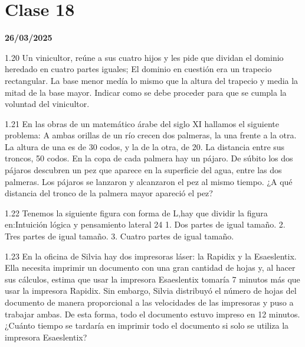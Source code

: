 \section{Clase 18}
\textbf{26/03/2025}

1.20 Un vinicultor, reúne a sus cuatro hijos y les pide que dividan el dominio heredado en cuatro partes iguales; El dominio en cuestión era un trapecio rectangular. La base menor medía lo mismo que la altura del trapecio y media la mitad de la base mayor. Indicar como se debe proceder para que se cumpla la voluntad del vinicultor.

1.21 En las obras de un matemático árabe del siglo XI hallamos el siguiente problema: A ambas orillas de un río crecen dos palmeras, la una frente a la otra. La altura de una es de 30 codos, y la de la otra, de 20. La distancia entre sus troncos, 50 codos. En la copa de cada palmera hay un pájaro. De súbito los dos pájaros descubren un pez que aparece en la superficie del agua, entre las dos palmeras. Los pájaros se lanzaron y alcanzaron el pez al mismo tiempo. ¿A qué distancia del tronco de la palmera mayor apareció el pez?

1.22 Tenemos la siguiente figura con forma de L,hay que dividir la figura en:Intuición lógica y pensamiento lateral 24
1. Dos partes de igual tamaño.
2. Tres partes de igual tamaño.
3. Cuatro partes de igual tamaño.

1.23 En la oficina de Silvia hay dos impresoras láser: la Rapidix y la Esaeslentix. Ella necesita imprimir un documento con una gran cantidad de hojas y, al hacer sus cálculos, estima que usar la impresora Esaeslentix tomaría 7 minutos más que usar la impresora Rapidix. Sin embargo, Silvia distribuyó el número de hojas del documento de manera proporcional a las velocidades de las impresoras y puso a trabajar ambas. De esta forma, todo el documento estuvo impreso en 12 minutos. ¿Cuánto tiempo se tardaría en imprimir todo el documento si solo se utiliza la impresora Esaeslentix?